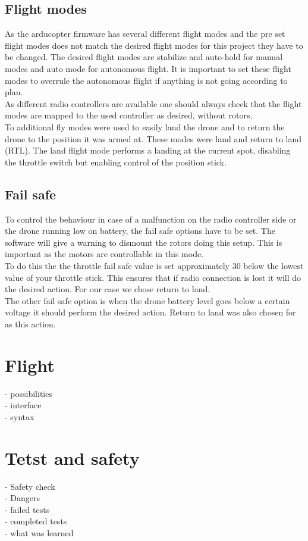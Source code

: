 \subsection*{Flight modes}
As the arducopter firmware has several different flight modes and the pre set flight modes does not match the desired flight modes for this project they have to be changed. The desired flight modes are stabilize and auto-hold for manual modes and auto mode for autonomous flight. It is important to set these flight modes to overrule the autonomous flight if anything is not going according to plan.\\
As different radio controllers are available one should always check that the flight modes are mapped to the used controller as desired, without rotors.\\
To additional fly modes were used to easily land the drone and to return the drone to the position it was armed at. These modes were land and return to land (RTL). The land flight mode performs a landing at the current spot, disabling the throttle switch but enabling control of the position stick.\\

\subsection*{Fail safe}
To control the behaviour in case of a malfunction on the radio controller side or the drone running low on battery, the fail safe options have to be set. The software will give a warning to dismount the rotors doing this setup. This is important as the motors are controllable in this mode.\\
To do this the the throttle fail safe value is set approximately 30 below the lowest value of your throttle stick. This ensures that if radio connection is lost it will do the desired action. For our case we chose return to land.\\
The other fail safe option is when the drone battery level goes below a certain voltage it should perform the desired action. Return to land was also chosen for as this action.

\section{Flight}
- possibilities\\
- interface\\
- syntax\\
\section{Tetst and safety}
- Safety check\\
- Dangers\\
- failed tests\\
- completed tests\\
- what was learned\\

